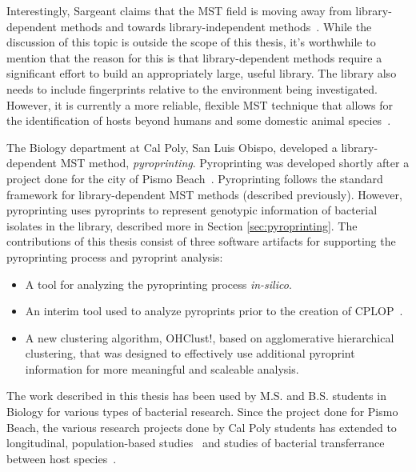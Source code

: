 \documentclass[12pt]{ucthesis}
\begin{document}
   Interestingly, Sargeant claims that the MST field is moving away from
   library-dependent methods and towards library-independent
   methods~\cite{Sargeant:ReviewMST}. While the discussion of this topic is
   outside the scope of this thesis, it's worthwhile to mention that the reason
   for this is that library-dependent methods require a significant effort to
   build an appropriately large, useful library. The library also needs to
   include fingerprints relative to the environment being investigated.
   However, it is currently a more reliable, flexible MST technique that allows
   for the identification of hosts beyond humans and some domestic animal
   species~\cite{Sargeant:ReviewMST}.

   The Biology department at Cal Poly, San Luis Obispo, developed a
   library-dependent MST method, \textit{pyroprinting}. Pyroprinting was
   developed shortly after a project done for the city of Pismo
   Beach~\cite{Kitts:Pismo, COSAM:Pismo}. Pyroprinting follows the standard
   framework for library-dependent MST methods (described previously). However,
   pyroprinting uses pyroprints to represent genotypic information of bacterial
   isolates in the library, described more in Section \ref{sec:pyroprinting}.
   The contributions of this thesis consist of three software artifacts for
   supporting the pyroprinting process and pyroprint analysis:
   \begin{itemize}
      \item A tool for analyzing the pyroprinting process \textit{in-silico}.
      \item An interim tool used to analyze pyroprints prior to the creation
            of CPLOP~\cite{Jan:Thesis}.
      \item A new clustering algorithm, \textsf{OHClust!}, based on
            \textsf{agglomerative hierarchical clustering}, that was designed
            to effectively use additional pyroprint information for more
            meaningful and scaleable analysis.
   \end{itemize}

   The work described in this thesis has been used by M.S. and B.S. students in
   Biology for various types of bacterial research. Since the project done for
   Pismo Beach, the various research projects done by Cal Poly students has
   extended to longitudinal, population-based studies~\cite{Emily:Demographics,
   Bufano:Humans_Pigs_Cows, Nguyen:Lambs_Ewes, Tang:Human} and studies of
   bacterial transferrance between host species~\cite{Josh:Cattle}.
\end{document}
